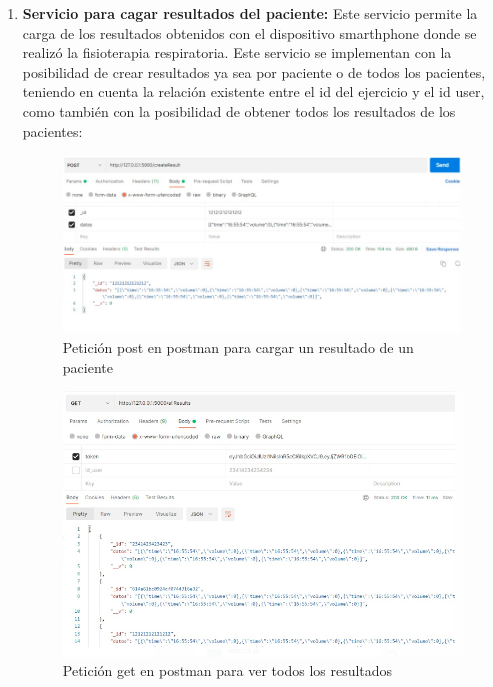 \documentclass[12pt]{article}
\begin{document}
\begin{enumerate}
            
    \item \textbf{Servicio para cagar resultados del paciente:}
    Este servicio permite la carga de los resultados obtenidos con el dispositivo smarthphone donde se realizó la fisioterapia respiratoria. Este servicio se implementan con la posibilidad de crear resultados ya sea por paciente o de todos los pacientes, teniendo en cuenta la relación existente entre el id del ejercicio y el id user, como también con la posibilidad de obtener todos los resultados de los pacientes:
    
            \begin{figure}[ht]
            \centering
            \includegraphics[scale=0.4]{imag/createresult.png}
            \caption{Petición post en postman para cargar un resultado de un paciente }
            \label{6}
            \end{figure}
            \FloatBarrier
            
            
            \begin{figure}[ht]
            \centering
            \includegraphics[scale=0.4]{imag/allresults.png}
            \caption{Petición get en postman para ver todos los resultados }
            \label{6}
            \end{figure}
            \FloatBarrier
            

\end{enumerate}
\end{document}

